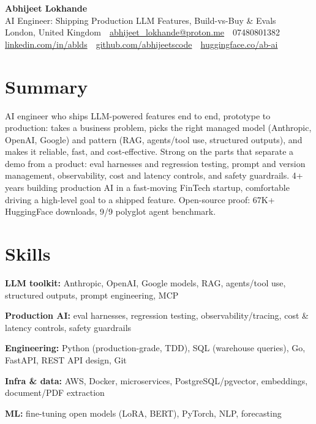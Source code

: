 \documentclass[10pt,a4paper]{article}
\newcommand{\sep}{\,\textcolor{accent!60}{\textbar}\,}
\begin{document}
\begin{center}
  {\fontsize{24}{26}\selectfont\bfseries Abhijeet Lokhande}\\[3pt]
  {\color{accent}\large AI Engineer: Shipping Production LLM Features, Build-vs-Buy \& Evals}\\[5pt]
  {\small
    London, United Kingdom \sep
    \href{mailto:abhijeet_lokhande@proton.me}{abhijeet\_lokhande@proton.me} \sep
    07480801382 \\[2pt]
    \href{https://www.linkedin.com/in/ablds/}{linkedin.com/in/ablds} \sep
    \href{https://github.com/abhijeetscode}{github.com/abhijeetscode} \sep
    \href{https://huggingface.co/ab-ai}{huggingface.co/ab-ai}
  }
\end{center}
\vspace{2pt}

\section{Summary}
AI engineer who ships LLM-powered features end to end, prototype to production: takes a business problem, picks the right managed model (Anthropic, OpenAI, Google) and pattern (RAG, agents/tool use, structured outputs), and makes it reliable, fast, and cost-effective. Strong on the parts that separate a demo from a product: eval harnesses and regression testing, prompt and version management, observability, cost and latency controls, and safety guardrails. 4+ years building production AI in a fast-moving FinTech startup, comfortable driving a high-level goal to a shipped feature. Open-source proof: 67K+ HuggingFace downloads, 9/9 polyglot agent benchmark.

\section{Skills}
\begin{tight}
  \item[\textcolor{accent}{\small$\bullet$}] \textbf{LLM toolkit:} Anthropic, OpenAI, Google models, RAG, agents/tool use, structured outputs, prompt engineering, MCP
  \item[\textcolor{accent}{\small$\bullet$}] \textbf{Production AI:} eval harnesses, regression testing, observability/tracing, cost \& latency controls, safety guardrails
  \item[\textcolor{accent}{\small$\bullet$}] \textbf{Engineering:} Python (production-grade, TDD), SQL (warehouse queries), Go, FastAPI, REST API design, Git
  \item[\textcolor{accent}{\small$\bullet$}] \textbf{Infra \& data:} AWS, Docker, microservices, PostgreSQL/pgvector, embeddings, document/PDF extraction
  \item[\textcolor{accent}{\small$\bullet$}] \textbf{ML:} fine-tuning open models (LoRA, BERT), PyTorch, NLP, forecasting
\end{tight}
\end{document}
